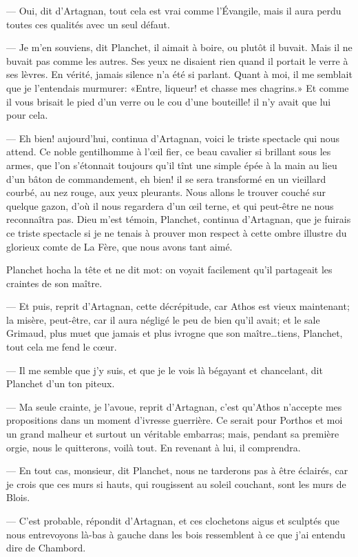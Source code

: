 — Oui, dit d'Artagnan, tout cela est vrai comme l'Évangile, mais il aura perdu toutes ces qualités avec un seul défaut.

— Je m'en souviens, dit Planchet, il aimait à boire, ou plutôt il buvait. Mais il ne buvait pas comme les autres. Ses yeux ne disaient rien quand il portait le verre à ses lèvres. En vérité, jamais silence n'a été si parlant. Quant à moi, il me semblait que je l'entendais murmurer: «Entre, liqueur! et chasse mes chagrins.» Et comme il vous brisait le pied d'un verre ou le cou d'une bouteille! il n'y avait que lui pour cela.

— Eh bien! aujourd'hui, continua d'Artagnan, voici le triste spectacle qui nous attend. Ce noble gentilhomme à l'œil fier, ce beau cavalier si brillant sous les armes, que l'on s'étonnait toujours qu'il tînt une simple épée à la main au lieu d'un bâton de commandement, eh bien! il se sera transformé en un vieillard courbé, au nez rouge, aux yeux pleurants. Nous allons le trouver couché sur quelque gazon, d'où il nous regardera d'un œil terne, et qui peut-être ne nous reconnaîtra pas. Dieu m'est témoin, Planchet, continua d'Artagnan, que je fuirais ce triste spectacle si je ne tenais à prouver mon respect à cette ombre illustre du glorieux comte de La Fère, que nous avons tant aimé.

Planchet hocha la tête et ne dit mot: on voyait facilement qu'il partageait les craintes de son maître.

— Et puis, reprit d'Artagnan, cette décrépitude, car Athos est vieux maintenant; la misère, peut-être, car il aura négligé le peu de bien qu'il avait; et le sale Grimaud, plus muet que jamais et plus ivrogne que son maître\dots tiens, Planchet, tout cela me fend le cœur.

— Il me semble que j'y suis, et que je le vois là bégayant et chancelant, dit Planchet d'un ton piteux.

— Ma seule crainte, je l'avoue, reprit d'Artagnan, c'est qu'Athos n'accepte mes propositions dans un moment d'ivresse guerrière. Ce serait pour Porthos et moi un grand malheur et surtout un véritable embarras; mais, pendant sa première orgie, nous le quitterons, voilà tout. En revenant à lui, il comprendra.

— En tout cas, monsieur, dit Planchet, nous ne tarderons pas à être éclairés, car je crois que ces murs si hauts, qui rougissent au soleil couchant, sont les murs de Blois.

— C'est probable, répondit d'Artagnan, et ces clochetons aigus et sculptés que nous entrevoyons là-bas à gauche dans les bois ressemblent à ce que j'ai entendu dire de Chambord.

